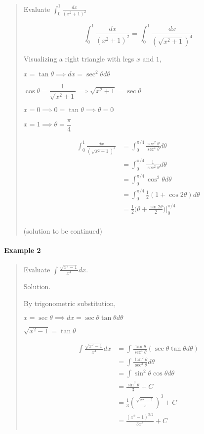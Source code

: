 \documentclass[
]{article}
\begin{document}
\begin{quote}
Evaluate \(\displaystyle \int_0^1 \frac{dx}{(x^2+1)^2}\)

\[ \int_0^1 \frac{dx}{(x^2+1)^2} = \int_0^1 \frac{dx}{(\sqrt{x^2+1})^4} \]

Visualizing a right triangle with legs \(x\) and \(1\),

\(x = \tan \theta \implies dx = \sec^2 \theta d\theta\)

\(\cos \theta =\dfrac{1}{\sqrt{x^2 +1}} \implies \sqrt{x^2 +1} = \sec \theta\)

\(x = 0 \implies 0 = \tan \theta \implies \theta = 0\)

\(x = 1 \implies \theta = \dfrac{\pi}{4}\)

\begin{align*}
\int_0^1 \frac{dx}{(\sqrt{x^2+1})^4} &= \int_0^{\pi/4} \frac{\sec^2 \theta}{\sec^4 \theta} d\theta \\
&= \int_0^{\pi/4} \frac{1}{\sec^2 \theta} d\theta \\
&= \int_0^{\pi/4} \cos^2 \theta d\theta \\
&= \int_0^{\pi/4} \frac{1}{2} (1 + \cos 2 \theta) d\theta  \\
&= \frac{1}{2} \Big(\theta + \frac{\sin 2\theta}{2}\Big) \Bigg|_0^{\pi/4}\\
\end{align*}

(solution to be continued)
\end{quote}

\hypertarget{example-2-7}{%
\paragraph*{Example 2}\label{example-2-7}}

\begin{quote}
Evaluate \(\displaystyle \int \frac{\sqrt{x^2-1}}{x^4}dx\).

Solution.

By trigonometric substitution,

\(x = \sec \theta \implies dx = \sec \theta \tan \theta d\theta\)

\(\sqrt{x^2 -1} = \tan \theta\)

\begin{align*}
\int \frac{\sqrt{x^2-1}}{x^4}dx &= \int \frac{\tan\theta}{\sec^4 \theta} (\sec \theta \tan \theta d\theta)\\
&= \int \frac{\tan^2\theta}{\sec^3 \theta} d\theta\\
&= \int \sin^2\theta \cos\theta d\theta\\
&= \frac{\sin^3 \theta}{3} + C\\
&= \frac{1}{3}(\frac{\sqrt{x^2-1}}{x})^3 + C\\
&= \frac{(x^2-1)^{3/2}}{3x^3} + C\\
\end{align*}
\end{quote}
\end{document}
